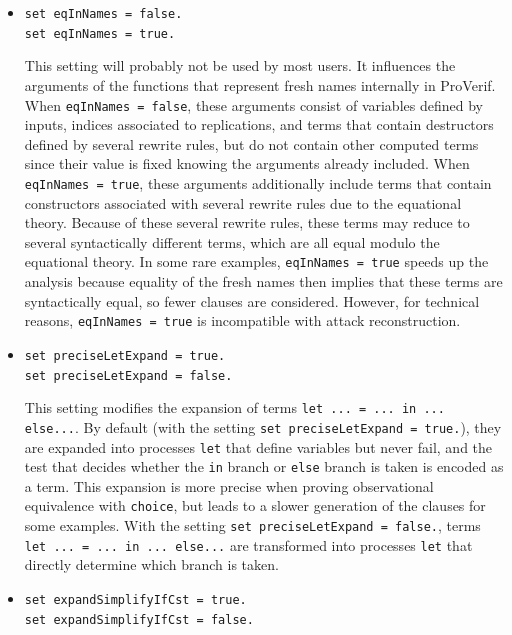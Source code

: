 \documentclass{book}
\begin{document}
\begin{itemize}
\item \lstinline{set eqInNames = false.}\\
\lstinline{set eqInNames = true.}

This setting will probably not be used by most users. It influences
the arguments of the functions that represent fresh names internally
in ProVerif. When \lstinline{eqInNames = false}, these arguments
consist of variables defined by inputs, indices associated to
replications, and terms that contain destructors defined by several
rewrite rules, but do not contain other computed terms since their
value is fixed knowing the arguments already included.
%
When \lstinline{eqInNames = true}, these arguments additionally
include terms that contain constructors associated with several
rewrite rules due to the equational theory. Because of these several
rewrite rules, these terms may reduce to several syntactically
different terms, which are all equal modulo the equational theory.  In
some rare examples, \lstinline{eqInNames = true} speeds up the
analysis because equality of the fresh names then implies that
these terms are syntactically equal, so fewer clauses are considered.
However, for technical reasons, \lstinline{eqInNames = true} is
incompatible with attack reconstruction.


\item \lstinline{set preciseLetExpand = true.}\\
\lstinline{set preciseLetExpand = false.}

This setting modifies the expansion of terms \lstinline!let ... = ... in ... else...!. By default (with the setting \lstinline{set preciseLetExpand = true.}), they are expanded into processes \lstinline!let! that define variables but never fail, and the test that decides whether the \lstinline!in! branch or \lstinline!else! branch is taken is encoded as a term. This expansion is more precise when proving observational equivalence with \lstinline!choice!, but leads to a slower generation of the clauses for some examples.
With the setting  \lstinline{set preciseLetExpand = false.}, terms \lstinline!let ... = ... in ... else...! are transformed into processes \lstinline!let! that directly determine which branch is taken.

\item \lstinline{set expandSimplifyIfCst = true.}\\
\lstinline{set expandSimplifyIfCst = false.}


\end{itemize}
\end{document}
